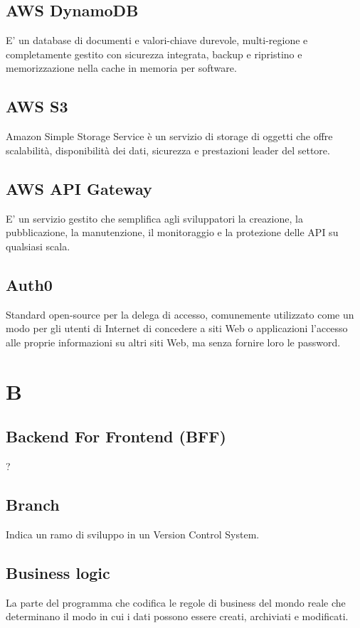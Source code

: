 \subsection*{AWS DynamoDB}
E' un database di documenti e valori-chiave durevole, multi-regione e completamente gestito con sicurezza integrata, backup e ripristino e memorizzazione nella cache in memoria per software.

\subsection*{AWS S3}
Amazon Simple Storage Service è un servizio di storage di oggetti che offre scalabilità, disponibilità dei dati, sicurezza e prestazioni leader del settore.

\subsection*{AWS API Gateway}
E' un servizio gestito che semplifica agli sviluppatori la creazione, la pubblicazione, la manutenzione, il monitoraggio e la protezione delle API su qualsiasi scala.

\subsection*{Auth0}
Standard open-source per la delega di accesso, comunemente utilizzato come un modo per gli utenti di Internet di concedere a siti Web o applicazioni l'accesso alle proprie informazioni su altri siti Web, ma senza fornire loro le password.

\section*{B}
\subsection*{Backend For Frontend (BFF)}
 ?

\subsection*{Branch}
Indica un ramo di sviluppo in un Version Control System.

\subsection*{Business logic}
La parte del programma che codifica le regole di business del mondo reale che determinano il modo in cui i dati possono essere creati, archiviati e modificati.

